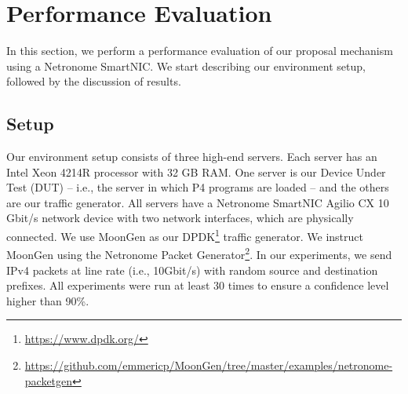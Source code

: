\section{Performance Evaluation}

In this section, we perform a performance evaluation of our proposal mechanism using a Netronome SmartNIC. We start describing our environment setup, followed by the discussion of results.

\subsection{Setup}

Our environment setup consists of three high-end servers. Each server has an Intel Xeon 4214R processor with 32 GB RAM. One server is our Device Under Test (DUT) -- i.e., the server in which P4 programs are loaded -- and the others are our traffic generator. All servers have a Netronome SmartNIC Agilio CX 10 Gbit/s network device with two network interfaces, which are physically connected. 
%
We use MoonGen\cite{moongen} as our DPDK\footnote{\url{https://www.dpdk.org/}} traffic generator. We instruct MoonGen using the Netronome Packet Generator\footnote{\url{https://github.com/emmericp/MoonGen/tree/master/examples/netronome-packetgen}}. In our experiments, we send IPv4 packets at line rate (i.e., 10Gbit/s) with random source and destination prefixes. All experiments were run at least 30 times to ensure a confidence level higher than 90\%.


%

